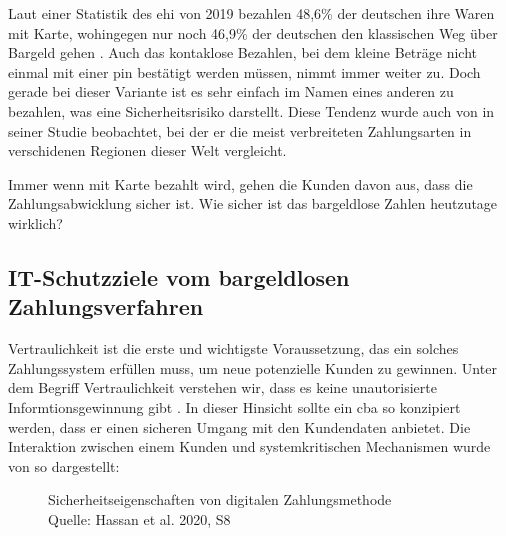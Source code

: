 Laut einer Statistik des \acrfull{ehi} von 2019 bezahlen 48,6\% der deutschen ihre Waren mit Karte, 
wohingegen nur noch 46,9\% der deutschen den klassischen Weg über Bargeld gehen \cite{refart:KSDL} . 
Auch das kontaklose Bezahlen, bei dem kleine Beträge nicht einmal mit einer \acrfull{pin} bestätigt 
werden müssen, nimmt immer weiter zu. Doch gerade bei dieser Variante ist es sehr einfach im Namen 
eines anderen zu bezahlen, was eine Sicherheitsrisiko darstellt. Diese Tendenz wurde auch von \cite{refart:TDMP} 
in seiner Studie beobachtet, bei der er die meist verbreiteten Zahlungsarten in verschidenen Regionen
 dieser Welt vergleicht. 


Immer wenn mit Karte bezahlt wird, gehen die Kunden davon aus, dass die Zahlungsabwicklung sicher ist. 
Wie sicher ist das bargeldlose Zahlen heutzutage wirklich? 


\subsection{IT-Schutzziele vom bargeldlosen Zahlungsverfahren}


Vertraulichkeit ist die erste und wichtigste Voraussetzung, das ein solches Zahlungssystem erfüllen muss, 
um neue potenzielle Kunden zu gewinnen. Unter dem Begriff Vertraulichkeit verstehen wir, dass es keine 
unautorisierte Informtionsgewinnung gibt \cite{refbook:SWIS}. In dieser Hinsicht sollte ein \acrshort{cba}
so konzipiert werden, dass er einen sicheren Umgang mit den Kundendaten anbietet. Die Interaktion zwischen
einem Kunden und systemkritischen Mechanismen wurde von \cite{refart:HARE} so dargestellt:

\vfill
\begin{figure}[htb]
    \caption{Sicherheitseigenschaften von digitalen Zahlungsmethode \\ Quelle: Hassan et al. 2020, S8}
    \label{fig:refark_HARE}
\end{figure}
\vfill

